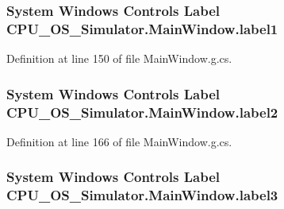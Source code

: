 \hypertarget{class_c_p_u___o_s___simulator_1_1_main_window_a09b3ba374a620331bc447b32959260c2}{}
\subsubsection[{label1}]{\setlength{\rightskip}{0pt plus 5cm}System Windows Controls Label C\+P\+U\+\_\+\+O\+S\+\_\+\+Simulator.\+Main\+Window.\+label1\hspace{0.3cm}{\ttfamily [package]}}\label{class_c_p_u___o_s___simulator_1_1_main_window_a09b3ba374a620331bc447b32959260c2}


Definition at line 150 of file Main\+Window.\+g.\+cs.

\hypertarget{class_c_p_u___o_s___simulator_1_1_main_window_a88c7b6748a5e198c673a3c3c5178d3b8}{}
\subsubsection[{label2}]{\setlength{\rightskip}{0pt plus 5cm}System Windows Controls Label C\+P\+U\+\_\+\+O\+S\+\_\+\+Simulator.\+Main\+Window.\+label2\hspace{0.3cm}{\ttfamily [package]}}\label{class_c_p_u___o_s___simulator_1_1_main_window_a88c7b6748a5e198c673a3c3c5178d3b8}


Definition at line 166 of file Main\+Window.\+g.\+cs.

\hypertarget{class_c_p_u___o_s___simulator_1_1_main_window_a94cf4fbdaebb09776745893c2bce1126}{}
\subsubsection[{label3}]{\setlength{\rightskip}{0pt plus 5cm}System Windows Controls Label C\+P\+U\+\_\+\+O\+S\+\_\+\+Simulator.\+Main\+Window.\+label3\hspace{0.3cm}{\ttfamily [package]}}\label{class_c_p_u___o_s___simulator_1_1_main_window_a94cf4fbdaebb09776745893c2bce1126}


